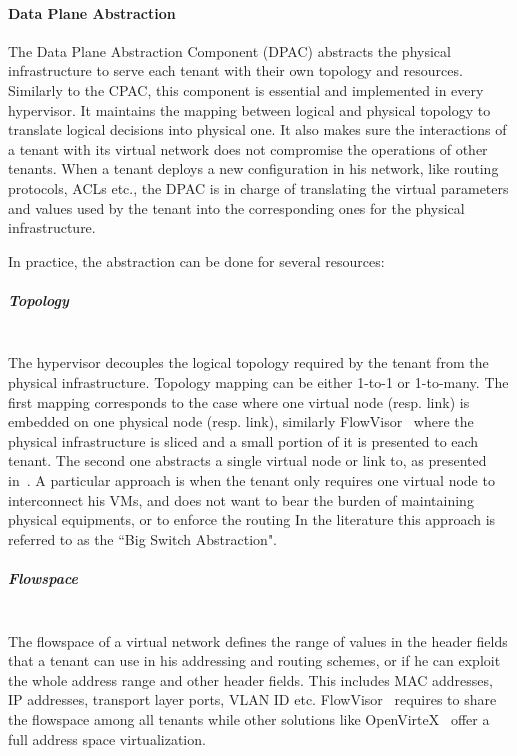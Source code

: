 \paragraph{Data Plane Abstraction}
\label{sec:abstraction_comp}
The Data Plane Abstraction Component (DPAC) abstracts the physical infrastructure to serve each tenant with their own topology and resources.
Similarly to the CPAC, this component is essential and implemented in every hypervisor.
It maintains the mapping between logical and physical topology to translate logical decisions into physical one.
It also makes sure the interactions of a tenant with its virtual network does not compromise the operations of other tenants. When a tenant deploys a new configuration in his network, like routing protocols, ACLs etc., the DPAC is in charge of translating the virtual parameters and values used by the tenant into the corresponding ones for the physical infrastructure.

In practice, the abstraction can be done for several resources:

\subparagraph{\textbf{Topology}}\textbf{}\\
The hypervisor decouples the logical topology required by the tenant from the physical infrastructure.
Topology mapping can be either 1-to-1 or 1-to-many. 
The first mapping corresponds to the case where one virtual node (resp. link) is embedded on one physical node (resp. link), similarly FlowVisor~\cite{FlowVisor-Sherwood2009} where the physical infrastructure is sliced and a small portion of it is presented to each tenant.
The second one abstracts a single virtual node or link to, as presented in~\cite{OpenVirteX-Al-Shabibi2014,VeRTIGO-Corin2012a}.
A particular approach is when the tenant only requires one virtual node to interconnect his VMs, and does not want to bear the burden of maintaining physical equipments, or to enforce the routing \etc In the literature this approach is referred to as the ``Big Switch Abstraction".


\subparagraph{\textbf{Flowspace}}\textbf{}\\
The flowspace of a virtual network defines the range of values in the header fields that a tenant can use in his addressing and routing schemes, or if he can exploit the whole address range and other header fields.
This includes MAC addresses, IP addresses, transport layer ports, VLAN ID etc.
FlowVisor~\cite{FlowVisor-Sherwood2009} requires to share the flowspace among all tenants while other solutions like OpenVirteX~\cite{OpenVirteX-Al-Shabibi2014} offer a full address space virtualization.


